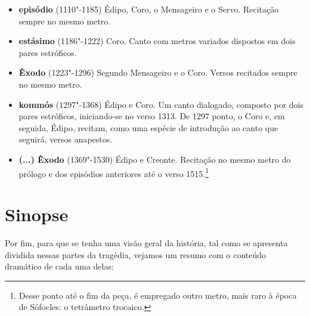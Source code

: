 \begin{itemize}
\item \textbf{ episódio} (1110"-1185)        
	 {Édipo, Coro, o Mensageiro e o Servo}. Recitação sempre no mesmo metro. 

\item \textbf{ estásimo} (1186"-1222)        
	 {Coro}. Canto com metros variados dispostos em dois pares estróficos. 

\item \textbf{Êxodo} (1223"-1296)                  
	 {Segundo Mensageiro e o Coro}. Versos recitados sempre no mesmo metro. 

\item \textbf{ kommós} (1297"-1368)         
	 {Édipo e Coro}. Um canto dialogado, composto por dois pares estróficos, iniciando-se no verso 1313. De 1297 
	 ponto, o Coro e, em seguida, Édipo, recitam, como uma espécie de introdução ao canto que seguirá, versos anapestos.

\item \textbf{(...) Êxodo} (1369"-1530)   
	 {Édipo e Creonte}. Recitação no mesmo metro do prólogo e dos episódios anteriores até o verso 1515.\footnote{
	 Desse ponto até o fim da peça, é empregado outro metro, mais raro à época de Sófocles: o tetrâmetro trocaico.}  
\end{itemize}

\section{Sinopse}

Por fim, para que se tenha uma visão geral da história, tal como se
apresenta dividida nessas partes da tragédia, vejamos um resumo com o
conteúdo dramático de cada uma delas:


